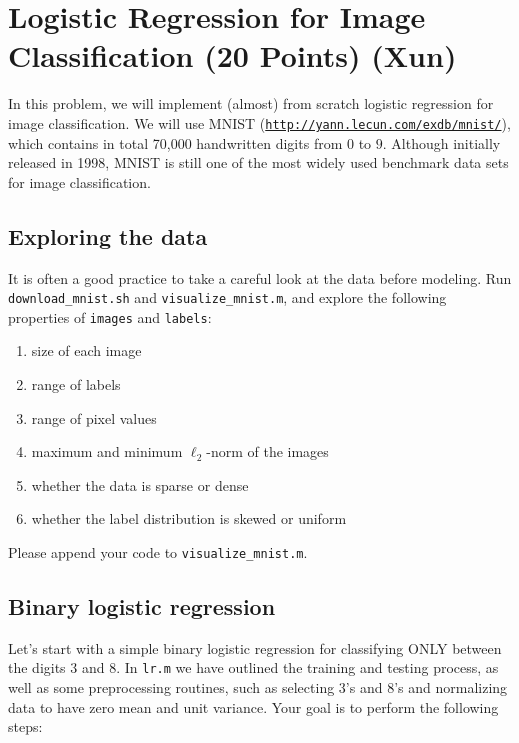 
\section{Logistic Regression for Image Classification (20 Points) (Xun)}

In this problem, we will implement (almost) from scratch logistic regression for image classification. 
We will use MNIST (\href{http://yann.lecun.com/exdb/mnist/}{\tt http://yann.lecun.com/exdb/mnist/}),  which contains in total 70,000 handwritten digits from $ 0 $ to $ 9 $. 
Although initially released in 1998, MNIST is still one of the most widely used benchmark data sets for image classification. 

\subsection{Exploring the data}
It is often a good practice to take a careful look at the data before modeling.
Run {\tt download\_mnist.sh} and {\tt visualize\_mnist.m},
and explore the following properties of {\tt images} and {\tt labels}:
\begin{enumerate}
\item size of each image
\item range of labels 
\item range of pixel values
\item maximum and minimum $ \ell_2 $-norm of the images
\item whether the data is sparse or dense
\item whether the label distribution is skewed or uniform
\end{enumerate}
Please append your code to {\tt visualize\_mnist.m}.


\subsection{Binary logistic regression}

Let's start with a simple binary logistic regression for classifying ONLY between the digits $3$ and $8$. 
In {\tt lr.m} we have outlined the training and testing process, as well as 
some preprocessing routines, such as selecting $ 3 $'s and $ 8 $'s and normalizing data to have zero mean and unit variance. 
Your goal is to perform the following steps: 


